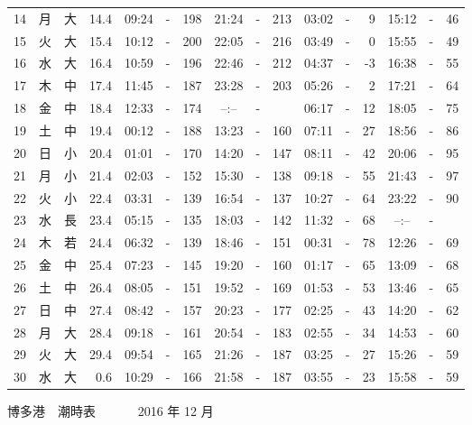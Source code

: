 \documentclass[12pt.a4j]{jsarticle}
\begin{document}
\begin{center}
\begin{table}[ht]
\begin{tabular}{|rc|cr|ccrccr|ccrccr|}
14 & 月 & 大 & 14.4 &  09:24 &-& 198  &  21:24 &-& 213  &   03:02 &-&   9  &   15:12 &-&  46  \\
15 & 火 & 大 & 15.4 &  10:12 &-& 200  &  22:05 &-& 216  &   03:49 &-&   0  &   15:55 &-&  49  \\
16 & 水 & 大 & 16.4 &  10:59 &-& 196  &  22:46 &-& 212  &   04:37 &-&  -3  &   16:38 &-&  55  \\
17 & 木 & 中 & 17.4 &  11:45 &-& 187  &  23:28 &-& 203  &   05:26 &-&   2  &   17:21 &-&  64  \\
18 & 金 & 中 & 18.4 &  12:33 &-& 174  &  --:-- &-&     &   06:17 &-&  12  &   18:05 &-&  75  \\
19 & 土 & 中 & 19.4 &  00:12 &-& 188  &  13:23 &-& 160  &   07:11 &-&  27  &   18:56 &-&  86  \\
20 & 日 & 小 & 20.4 &  01:01 &-& 170  &  14:20 &-& 147  &   08:11 &-&  42  &   20:06 &-&  95  \\
21 & 月 & 小 & 21.4 &  02:03 &-& 152  &  15:30 &-& 138  &   09:18 &-&  55  &   21:43 &-&  97  \\
22 & 火 & 小 & 22.4 &  03:31 &-& 139  &  16:54 &-& 137  &   10:27 &-&  64  &   23:22 &-&  90  \\
23 & 水 & 長 & 23.4 &  05:15 &-& 135  &  18:03 &-& 142  &   11:32 &-&  68  &   --:-- &-&     \\
24 & 木 & 若 & 24.4 &  06:32 &-& 139  &  18:46 &-& 151  &   00:31 &-&  78  &   12:26 &-&  69  \\
25 & 金 & 中 & 25.4 &  07:23 &-& 145  &  19:20 &-& 160  &   01:17 &-&  65  &   13:09 &-&  68  \\
26 & 土 & 中 & 26.4 &  08:05 &-& 151  &  19:52 &-& 169  &   01:53 &-&  53  &   13:46 &-&  65  \\
27 & 日 & 中 & 27.4 &  08:42 &-& 157  &  20:23 &-& 177  &   02:25 &-&  43  &   14:20 &-&  62  \\
28 & 月 & 大 & 28.4 &  09:18 &-& 161  &  20:54 &-& 183  &   02:55 &-&  34  &   14:53 &-&  60  \\
29 & 火 & 大 & 29.4 &  09:54 &-& 165  &  21:26 &-& 187  &   03:25 &-&  27  &   15:26 &-&  59  \\
30 & 水 & 大 &  0.6 &  10:29 &-& 166  &  21:58 &-& 187  &   03:55 &-&  23  &   15:58 &-&  59  \\
   \hline
   \end{tabular}
\end{table}
\newpage
 {\LARGE 博多港　潮時表　　　}
 {\large 2016 年 12 月}\\
 \begin{table}[ht]

\end{table}
\end{center}
\end{document}
